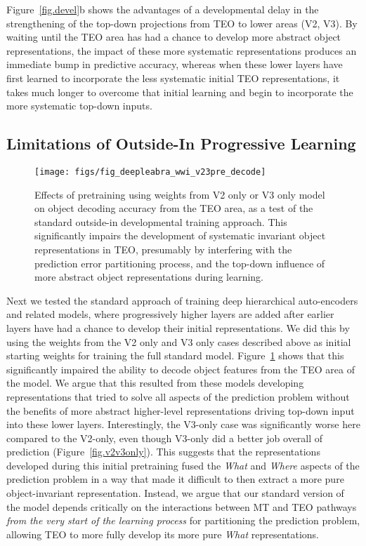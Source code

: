 \documentclass[11pt,twoside]{article}
\newif\myifpdf
\begin{document}
Figure~\ref{fig.devel}b shows the advantages of a developmental delay in the strengthening of the top-down projections from TEO to lower areas (V2, V3).  By waiting until the TEO area has had a chance to develop more abstract object representations, the impact of these more systematic representations produces an immediate bump in predictive accuracy, whereas when these lower layers have first learned to incorporate the less systematic initial TEO representations, it takes much longer to overcome that initial learning and begin to incorporate the more systematic top-down inputs.

\subsection{Limitations of Outside-In Progressive Learning}

\begin{figure}
  \centering\texttt{[image: figs/fig\_deepleabra\_wwi\_v23pre\_decode]}
  \caption{\footnotesize Effects of pretraining using weights from V2 only or V3 only model on object decoding accuracy from the TEO area, as a test of the standard outside-in developmental training approach.  This significantly impairs the development of systematic invariant object representations in TEO, presumably by interfering with the prediction error partitioning process, and the top-down influence of more abstract object representations during learning.}
  \label{fig.v23_pre}
\end{figure}

Next we tested the standard approach of training deep hierarchical auto-encoders and related models, where progressively higher layers are added after earlier layers have had a chance to develop their initial representations.  We did this by using the weights from the V2 only and V3 only cases described above as initial starting weights for training the full standard model.  Figure~\ref{fig.v23_pre} shows that this significantly impaired the ability to decode object features from the TEO area of the model.  We argue that this resulted from these models developing representations that tried to solve all aspects of the prediction problem without the benefits of more abstract higher-level representations driving top-down input into these lower layers.  Interestingly, the V3-only case was significantly worse here compared to the V2-only, even though V3-only did a better job overall of prediction (Figure~\ref{fig.v2v3only}).  This suggests that the representations developed during this initial pretraining fused the {\em What} and {\em Where} aspects of the prediction problem in a way that made it difficult to then extract a more pure object-invariant representation.  Instead, we argue that our standard version of the model depends critically on the interactions between MT and TEO pathways {\em from the very start of the learning process} for partitioning the prediction problem, allowing TEO to more fully develop its more pure {\em What} representations.
\end{document}
